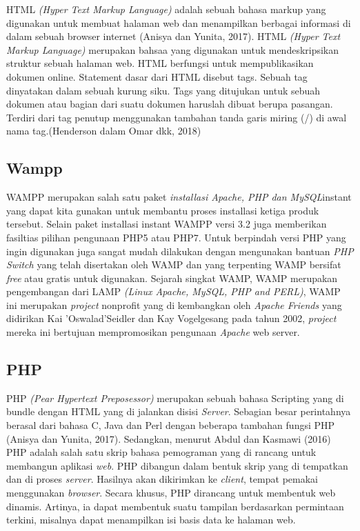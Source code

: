 HTML \textit{(Hyper Text Markup Language)} adalah sebuah bahasa markup yang digunakan untuk membuat halaman web dan menampilkan berbagai informasi di dalam sebuah browser internet (Anisya dan Yunita, 2017).
HTML \textit{(Hyper Text Markup Language)} merupakan bahsaa yang digunakan untuk mendeskripsikan struktur sebuah halaman web. HTML berfungsi untuk mempublikasikan dokumen online. Statement dasar dari HTML disebut tags. Sebuah tag dinyatakan dalam sebuah kurung siku. Tags yang ditujukan untuk sebuah dokumen atau bagian dari suatu dokumen haruslah dibuat berupa pasangan. Terdiri dari tag penutup menggunakan tambahan tanda garis miring (/) di awal nama tag.(Henderson dalam Omar dkk, 2018)

\subsection{Wampp}
WAMPP merupakan salah satu paket \textit{installasi Apache, PHP dan MySQL}instant yang dapat kita gunakan untuk membantu proses installasi ketiga produk tersebut. Selain paket installasi instant WAMPP versi 3.2 juga memberikan fasiltias pilihan pengunaan PHP5 atau PHP7. Untuk berpindah versi PHP yang ingin digunakan juga sangat mudah dilakukan dengan mengunakan bantuan \textit{PHP Switch} yang telah disertakan oleh WAMP dan yang terpenting WAMP bersifat \textit{free} atau gratis untuk digunakan.
Sejarah singkat WAMP, WAMP merupakan pengembangan dari LAMP
\textit{(Linux Apache, MySQL, PHP and PERL)}, WAMP ini merupakan \textit{project} nonprofit yang di kembangkan oleh \textit{Apache Friends} yang didirikan Kai 'Oswalad'Seidler dan Kay Vogelgesang pada tahun 2002, \textit{project} mereka ini bertujuan mempromosikan pengunaan \textit{Apache} web server.

\subsection{PHP}
PHP \textit{(Pear Hypertext Preposessor)} merupakan sebuah bahasa Scripting yang di bundle dengan HTML yang di jalankan disisi \textit{Server}. Sebagian besar perintahnya berasal dari bahasa C, Java dan Perl dengan beberapa tambahan fungsi PHP (Anisya dan Yunita, 2017). Sedangkan, menurut Abdul dan Kasmawi (2016) PHP adalah salah satu skrip bahasa pemograman yang di rancang untuk membangun aplikasi \textit{web}. PHP dibangun dalam bentuk skrip yang di tempatkan dan di proses \textit{server}. Hasilnya akan dikirimkan ke \textit{client}, tempat pemakai menggunakan \textit{browser}. Secara khusus, PHP dirancang untuk membentuk web dinamis. Artinya, ia dapat membentuk suatu tampilan berdasarkan permintaan terkini, misalnya dapat menampilkan isi basis data ke halaman web.


